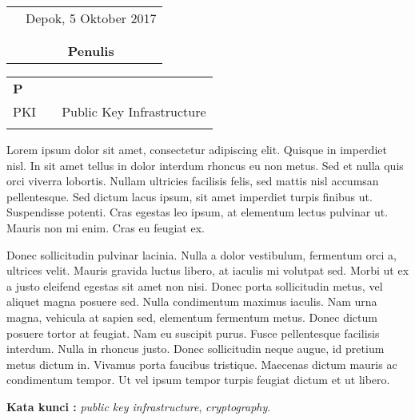 \documentclass{sttnfskripsi}
\begin{document}
\begin{tabular}{p{7.5cm}c}
&Depok, 5 Oktober 2017\\
&\\
&\\
&\textbf{Penulis}
\end{tabular}

\tableofcontents
{}
\listoftables
{}
\listoffigures
{}

\singkatan
\noindent

\begin{tabular}{p{20pt}p{3pt}l}
\textbf{P}\\
    PKI & & Public Key Infrastructure\\
\\
\end{tabular}


\begin{abstractind}
Lorem ipsum dolor sit amet, consectetur adipiscing elit. Quisque in imperdiet nisl. In sit amet tellus in dolor interdum rhoncus eu non metus. Sed et nulla quis orci viverra lobortis. Nullam ultricies facilisis felis, sed mattis nisl accumsan pellentesque. Sed dictum lacus ipsum, sit amet imperdiet turpis finibus ut. Suspendisse potenti. Cras egestas leo ipsum, at elementum lectus pulvinar ut. Mauris non mi enim. Cras eu feugiat ex.

Donec sollicitudin pulvinar lacinia. Nulla a dolor vestibulum, fermentum orci a, ultrices velit. Mauris gravida luctus libero, at iaculis mi volutpat sed. Morbi ut ex a justo eleifend egestas sit amet non nisi. Donec porta sollicitudin metus, vel aliquet magna posuere sed. Nulla condimentum maximus iaculis. Nam urna magna, vehicula at sapien sed, elementum fermentum metus. Donec dictum posuere tortor at feugiat. Nam eu suscipit purus. Fusce pellentesque facilisis interdum. Nulla in rhoncus justo. Donec sollicitudin neque augue, id pretium metus dictum in. Vivamus porta faucibus tristique. Maecenas dictum mauris ac condimentum tempor. Ut vel ipsum tempor turpis feugiat dictum et ut libero.

\bigskip
\noindent
\textbf{Kata kunci :} \emph{public key infrastructure}, \emph{cryptography}.
\end{abstractind}
\end{document}
